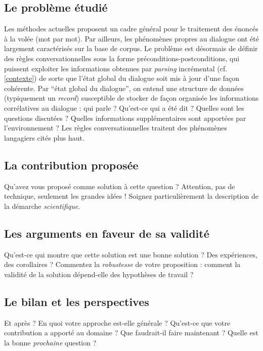 \documentclass[11pt]{article}
\begin{document}
\subsection*{Le problème étudié}
Les méthodes actuelles proposent un cadre général pour le traitement des énoncés à la volée (mot par mot). Par ailleurs, les phénomènes propres au dialogue ont été largement caractérisés sur la base de corpus. Le problème est désormais de définir des règles conversationnelles sous la forme préconditions-postconditions, qui puissent exploiter les informations obtenues par \textit{parsing} incrémental (cf. \ref{contexte}) de sorte que l'état global du dialogue soit mis à jour d'une façon cohérente. Par ``état global du dialogue'', on entend une structure de données (typiquement un \textit{record}) susceptible de stocker de façon organisée les informations corrélatives au dialogue : qui parle ? Qu'est-ce qui a été dit ? Quelles sont les questions discutées ? Quelles informations supplémentaires sont apportées par l'environnement ? Les règles conversationnelles traitent des phénomènes langagiers cités plus haut.


\subsection*{La contribution proposée}

Qu'avez vous proposé comme solution à cette question ? 
Attention, pas de technique, seulement les grandes idées ! 
Soignez particulièrement la description de la démarche \emph{scientifique}.

\subsection*{Les arguments en faveur de sa validité}

Qu'est-ce qui montre que cette solution est une bonne solution ?
Des expériences, des corollaires ? 
Commentez la \emph{robustesse} de votre proposition : 
comment la validité de la solution dépend-elle des hypothèses de travail ?

\subsection*{Le bilan et les perspectives}

Et après ? En quoi votre approche est-elle générale ? 
Qu'est-ce que votre contribution a apporté au domaine ? 
Que faudrait-il faire maintenant ? 
Quelle est la bonne \emph{prochaine} question ?
\end{document}
